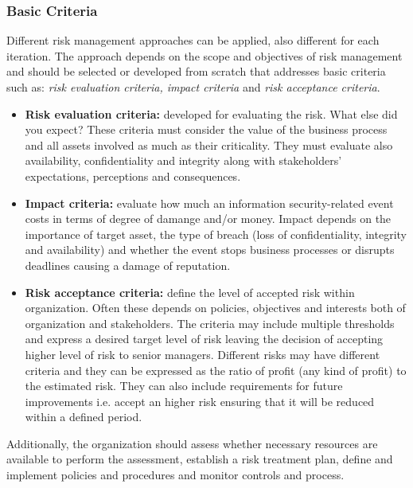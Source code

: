 \subsubsection{Basic Criteria}
Different risk management approaches can be applied, also different for each iteration. The approach depends on the scope and objectives of risk management and should be selected or developed from scratch that addresses basic criteria such as: \textit{risk evaluation criteria, impact criteria} and \textit{risk acceptance criteria}.
\begin{itemize}
\itemsep 0em
    \item \textbf{Risk evaluation criteria:} developed for evaluating the risk. What else did you expect? These criteria must consider the value of the business process and all assets involved as much as their criticality. They must evaluate also availability, confidentiality and integrity along with stakeholders' expectations, perceptions and consequences.
    \item \textbf{Impact criteria:} evaluate how much an information security-related event costs in terms of degree of damange and/or money. Impact depends on the importance of target asset, the type of breach (loss of confidentiality, integrity and availability) and whether the event stops business processes or disrupts deadlines causing a damage of reputation.
    \item \textbf{Risk acceptance criteria:} define the level of accepted risk within organization. Often these depends on policies, objectives and interests both of organization and stakeholders. The criteria may include multiple thresholds and express a desired target level of risk leaving the decision of accepting higher level of risk to senior managers. Different risks may have different criteria and they can be expressed as the ratio of profit (any kind of profit) to the estimated risk. They can also include requirements for future improvements i.e. accept an higher risk ensuring that it will be reduced within a defined period.
\end{itemize}
Additionally, the organization should assess whether necessary resources are available to perform the assessment, establish a risk treatment plan, define and implement policies and procedures and monitor controls and process.
